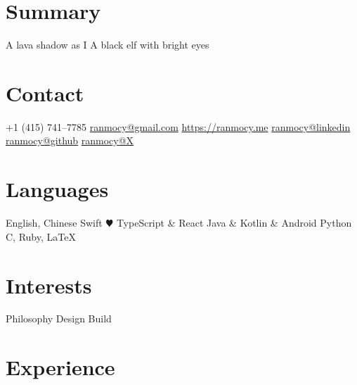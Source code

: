 \documentclass[]{friggeri-cv}
\begin{document}


\begin{aside} %
  \section{Summary}
  A lava shadow as I
  A black elf
  with bright eyes
  \section{Contact}
  +1 (415) 741--7785
  \href{mailto:ranmocy+cv@gmail.com}{ranmocy@gmail.com}
  \href{https://ranmocy.me}{https://ranmocy.me}
  \href{https://www.linkedin.com/in/ranmocy}{ranmocy@linkedin}
  \href{https://github.com/ranmocy}{ranmocy@github}
  \href{https://twitter.com/ranmocy}{ranmocy@X}
  \section{Languages}
  English, Chinese
  Swift {\color{red} $\varheartsuit$}
  TypeScript \& React
  Java \& Kotlin \& Android
  Python
  C, Ruby, LaTeX
  \section{Interests}
  Philosophy
  Design
  Build
\end{aside}




\section{Experience}
\end{document}
